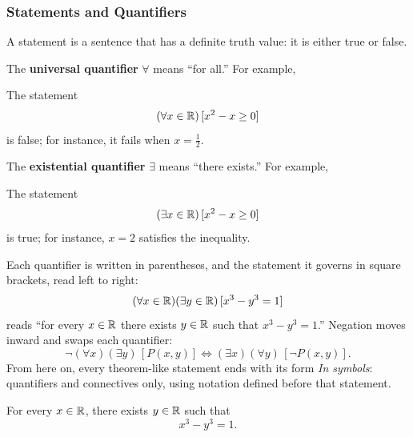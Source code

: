 \subsubsection{Statements and Quantifiers}
\begin{definition}[Statement]\label{def:statement}
    A statement is a sentence that has a definite truth value: it is either true or false.
\end{definition}

The \textbf{universal quantifier} $\forall$ means ``for all.'' For example,
\begin{example}
    The statement
    \begin{equation*}
        (\forall x \in \mathbb{R})\,[x^2-x\geq 0]
    \end{equation*}
    is false; for instance, it fails when $x=\frac12$.
\end{example}

The \textbf{existential quantifier} $\exists$ means ``there exists.'' For example,
\begin{example}
    The statement
    \begin{equation*}
        (\exists x \in \mathbb{R})\,[x^2-x\geq 0]
    \end{equation*}
    is true; for instance, $x=2$ satisfies the inequality.
\end{example}

\begin{notation}
    Each quantifier is written in parentheses, and the statement it governs in square brackets, read left to right:
    \[
        (\forall x\in\mathbb{R})(\exists y\in\mathbb{R})\,[x^3-y^3=1]
    \]
    reads ``for every $x\in\mathbb{R}$ there exists $y\in\mathbb{R}$ such that $x^3-y^3=1$.'' Negation moves inward and swaps each quantifier:
    \[
        \neg(\forall x)(\exists y)\,[P(x,y)] \iff (\exists x)(\forall y)\,[\neg P(x,y)].
    \]
    From here on, every theorem-like statement ends with its form \emph{In symbols}: quantifiers and connectives only, using notation defined before that statement.
\end{notation}

\begin{proposition}\label{prop:exists-y-cube}
    For every $x\in\mathbb{R}$, there exists $y\in\mathbb{R}$ such that
    \begin{equation*}
        x^3-y^3=1.
    \end{equation*}
\end{proposition}

